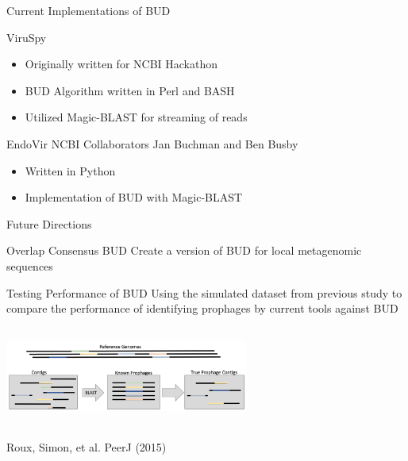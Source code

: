 \documentclass[11pt, xcolor=table]{beamer}
\begin{document}
	\begin{frame}{Current Implementations of BUD}
	\begin{block}{ViruSpy}
	\begin{itemize}
	\item Originally written for NCBI Hackathon
	\item BUD Algorithm written in Perl and BASH
	\item Utilized Magic-BLAST for streaming of reads 
	\end{itemize}
	\end{block}
	
	\begin{block}{EndoVir}
	NCBI Collaborators Jan Buchman and Ben Busby \\ 
	\begin{itemize}
	\item Written in Python
	\item Implementation of BUD with Magic-BLAST
	\end{itemize}
	\end{block}
	\end{frame}
	\begin{frame}{Future Directions}
	\begin{block}{Overlap Consensus BUD}
	Create a version of BUD for local metagenomic sequences 
	\end{block}
	
	\begin{block}{Testing Performance of BUD}
	Using the simulated dataset from previous study to compare the performance of identifying prophages by current tools against BUD
	\center
	\includegraphics[height=4cm, width=8cm]{fig.png}
	\\
	\vspace{0.5cm}
	\tiny{Roux, Simon, et al. PeerJ (2015)}
	\end{block}
	\end{frame}
	
	
\end{document}
